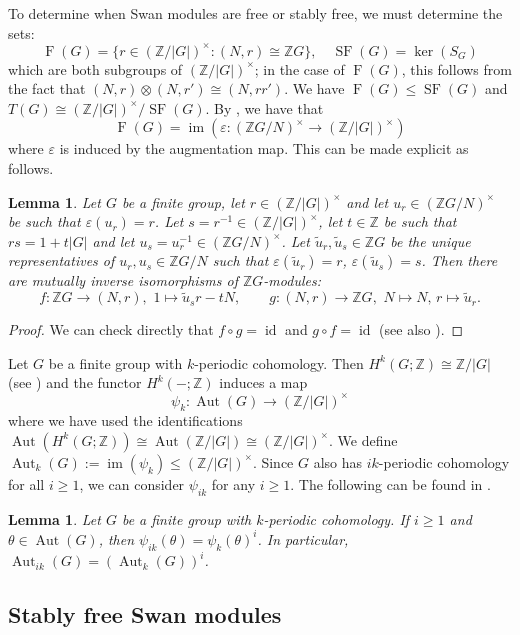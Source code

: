 \documentclass[11pt,leqno,a4paper]{amsart}
\newcommand{\Z}{\mathbb{Z}}
\DeclareMathOperator{\Aut}{Aut}
\DeclareMathOperator{\id}{id}
\DeclareMathOperator{\IM}{im}
\DeclareMathOperator{\SF}{SF}
\DeclareMathOperator{\FF}{F}
\newtheorem{lemma}[thm]{Lemma}
\theoremstyle{definition}
\theoremstyle{remark}
\theoremstyle{custom}
\newcommand{\wt}{\widetilde}
\begin{document}
To determine when Swan modules are free or stably free, we must determine the sets:
\[ \FF(G) = \{ r \in (\Z/|G|)^\times : (N,r) \cong \Z G\}, \quad 
\SF(G) = \ker(S_G)
\]
which are both subgroups of $(\Z/|G|)^\times$; in the case of $\FF(G)$, this follows from the fact that $(N,r) \otimes (N,r') \cong (N,rr')$.
We have $\FF(G) \le \SF(G)$ and $T(G) \cong (\Z/|G|)^\times/\SF(G)$. By \cite[Lemma 6.3]{Sw60-II}, we have that
\[ \FF(G) = \IM(\varepsilon : (\Z G/N)^\times \to (\Z/|G|)^\times) \]
where $\varepsilon$ is induced by the augmentation map. This can be made explicit as follows. 

\begin{lemma} \label{lemma:ZG/N-unit-to-isomorphism}
Let $G$ be a finite group, let $r \in (\Z/|G|)^\times$ and let $u_r \in (\Z G/N)^\times$ be such that $\varepsilon(u_r) = r$. 
Let $s = r^{-1} \in (\Z/|G|)^\times$, let $t \in \Z$ be such that $rs = 1 + t|G|$ and let $u_s = u_r^{-1} \in (\Z G/N)^\times$.
Let $\wt u_r, \wt u_s \in \Z G$ be the unique representatives of $u_r, u_s \in \Z G/N$ such that $\varepsilon(\wt u_r ) = r$, $\varepsilon(\wt u_s) = s$.
Then there are mutually inverse isomorphisms of $\Z G$-modules:
\[ f : \Z G \to (N,r), \,\, 1 \mapsto \wt u_s r - tN, \qquad g : (N,r) \to \Z G, \,\, N \mapsto N, \, r \mapsto \wt u_r. \]
\end{lemma}

\begin{proof}
We can check directly that $f \circ g = \id$ and $g \circ f = \id$ (see also \cite[Lemma 6.3]{Sw60-II}).
\end{proof}

Let $G$ be a finite group with $k$-periodic cohomology. Then $H^k(G;\Z) \cong \Z/|G|$ (see \cite[XII.11.1]{CE56}) and the functor $H^k(-;\Z)$ induces a map
\[ \psi_k : \Aut(G) \to (\Z/|G|)^\times \]
where we have used the identifications $\Aut(H^k(G;\Z)) \cong \Aut(\Z/|G|) \cong (\Z/|G|)^\times$. We define $\Aut_k(G) := \IM(\psi_k) \le (\Z/|G|)^\times$. 
Since $G$ also has $ik$-periodic cohomology for all $i \ge 1$, we can consider $\psi_{ik}$ for any $i \ge 1$.
The following can be found in \cite[Lemma 6.7]{Ni20a}.

\begin{lemma} \label{lemma:psi_k-properties}
  Let $G$ be a finite group with $k$-periodic cohomology. If $i \ge 1$ and $\theta \in \Aut(G)$, then $\psi_{ik}(\theta) = \psi_k(\theta)^i$. In particular, $\Aut_{ik}(G) = (\Aut_k(G))^i$.
\end{lemma}

\subsection{Stably free Swan modules}
\label{ss:swan-stablyfree}
\end{document}
